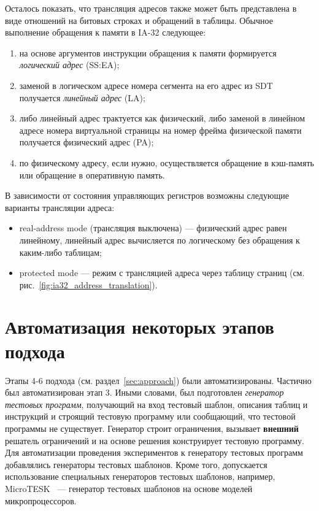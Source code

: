 Осталось показать, что трансляция адресов также может быть представлена в виде
отношений на битовых строках и обращений в таблицы. Обычное выполнение
обращения к памяти в IA-32 следующее:
\begin{enumerate}
    \item на основе аргументов инструкции обращения к памяти формируется \emph{логический адрес} (SS:EA);
    \item заменой в логическом адресе номера сегмента на его адрес из SDT получается \emph{линейный адрес} (LA);
    \item либо линейный адрес трактуется как физический, либо заменой в линейном адресе номера виртуальной страницы на номер фрейма физической памяти получается физический адрес (PA);
    \item по физическому адресу, если нужно, осуществляется обращение в кэш-память или обращение в оперативную память.
\end{enumerate}

В зависимости от состояния управляющих регистров возможны следующие варианты трансляции адреса:
\begin{itemize}
  \item real-address mode (трансляция выключена) --- физический адрес равен линейному, линейный адрес вычисляется по логическому без обращения к каким-либо таблицам;
  \item protected mode --- режим с трансляцией адреса через таблицу страниц (см. рис.~\ref{fig:ia32_address_translation}).
\end{itemize}



\section{Автоматизация некоторых этапов подхода}

Этапы 4-6 подхода (см. раздел~\ref{sec:approach}) были автоматизированы. Частично был автоматизирован этап 3. Иными словами, был подготовлен \emph{генератор тестовых программ}, получающий на вход тестовый шаблон, описания таблиц и инструкций и строящий тестовую программу или сообщающий, что тестовой программы не существует. Генератор строит ограничения, вызывает \textbf{внешний} решатель ограничений и на основе решения конструирует тестовую программу. Для автоматизации проведения экспериментов к генератору тестовых программ добавлялись генераторы тестовых шаблонов. Кроме того, допускается использование специальных генераторов тестовых шаблонов, например,\\ MicroTESK~\cite{MicroTESK} --- генератор тестовых шаблонов на основе моделей микропроцессоров.

